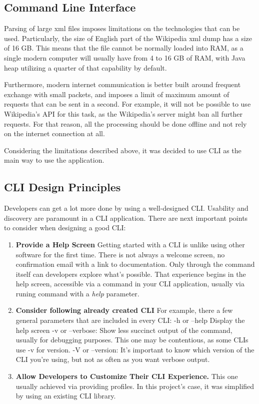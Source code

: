 \documentclass[thesis=M,english,hidelinks]{FITthesis}[2019/12/23]
\begin{document}
\subsection{Command Line Interface}

Parsing of large xml files imposes limitations on the technologies that can be used. Particularly, the size of English part of the Wikipedia xml dump has a size of 16 GB. This means that the file cannot be normally loaded into \gls{RAM}, as a single modern computer will usually have from 4 to 16 GB of \gls{RAM}, with Java heap utilizing a quarter of that capability by default. 

Furthermore, modern internet communication is better built around frequent exchange with small packets, and imposes a limit of maximum amount of requests that can be sent in a second. For example, it will not be possible to use Wikipedia's API for this task, as the Wikipedia's server might ban all further requests. For that reason, all the processing should be done offline and not rely on the internet connection at all.

Considering the limitations described above, it was decided to use \gls{CLI} as the main way to use the application. 

\subsection{CLI Design Principles}

Developers can get a lot more done by using a well-designed CLI. Usability and discovery are paramount in a CLI application. There are next important points to consider when designing a good CLI:
\begin{enumerate}
	\item \textbf{Provide a Help Screen} Getting started with a CLI is unlike using other software for the first time. There is not always a welcome screen, no confirmation email with a link to documentation. Only through the command itself can developers explore what’s possible. That experience begins in the help screen, accessible via a command in your CLI application, usually via runing command with a \textit{help} parameter.
	\item \textbf{Consider following already created CLI} For example, there a few general parameters that are included in every CLI: 
	\subitem -h or --help Display the help screen
	\subitem -v or --verbose: Show less succinct output of the command, usually for debugging purposes. This one may be contentious, as some CLIs use -v for version.
	\subitem -V or --version: It’s important to know which version of the CLI you’re using, but not as often as you want verbose output.
	\item \textbf{Allow Developers to Customize Their CLI Experience.} This one usually achieved via providing profiles. In this project's case, it was simplified by using an existing CLI library.
\end{enumerate}
\end{document}
